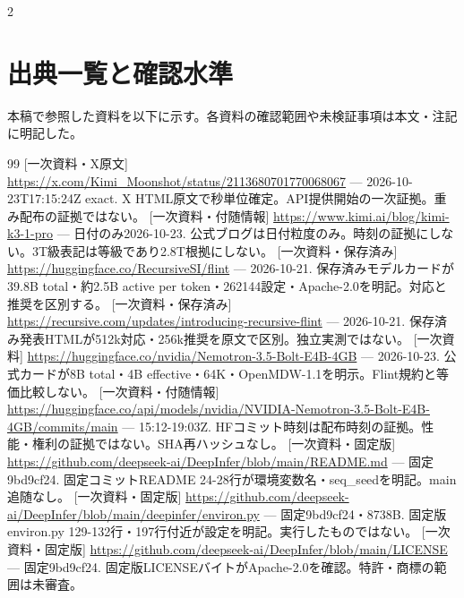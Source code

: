 \documentclass[lualatex,a4paper,10pt]{jlreq}
\begin{document}
\begin{multicols}{2} %
\section*{出典一覧と確認水準}
本稿で参照した資料を以下に示す。各資料の確認範囲や未検証事項は本文・注記に明記した。

{\footnotesize\setlength{\itemsep}{2pt}\setlength{\parsep}{0pt}
\begin{thebibliography}{99}
 [一次資料・X原文] \url{https://x.com/Kimi_Moonshot/status/2113680701770068067} --- 2026-10-23T17:15:24Z exact. X HTML原文で秒単位確定。API提供開始の一次証拠。重み配布の証拠ではない。
 [一次資料・付随情報] \url{https://www.kimi.ai/blog/kimi-k3-1-pro} --- 日付のみ2026-10-23. 公式ブログは日付粒度のみ。時刻の証拠にしない。3T級表記は等級であり2.8T根拠にしない。
 [一次資料・保存済み] \url{https://huggingface.co/RecursiveSI/flint} --- 2026-10-21. 保存済みモデルカードが39.8B total・約2.5B active per token・262144設定・Apache-2.0を明記。対応と推奨を区別する。
 [一次資料・保存済み] \url{https://recursive.com/updates/introducing-recursive-flint} --- 2026-10-21. 保存済み発表HTMLが512k対応・256k推奨を原文で区別。独立実測ではない。
 [一次資料] \url{https://huggingface.co/nvidia/Nemotron-3.5-Bolt-E4B-4GB} --- 2026-10-23. 公式カードが8B total・4B effective・64K・OpenMDW-1.1を明示。Flint規約と等価比較しない。
 [一次資料・付随情報] \url{https://huggingface.co/api/models/nvidia/NVIDIA-Nemotron-3.5-Bolt-E4B-4GB/commits/main} --- 15:12-19:03Z. HFコミット時刻は配布時刻の証拠。性能・権利の証拠ではない。SHA再ハッシュなし。
 [一次資料・固定版] \url{https://github.com/deepseek-ai/DeepInfer/blob/main/README.md} --- 固定9bd9cf24. 固定コミットREADME 24-28行が環境変数名・seq\_seedを明記。main追随なし。
 [一次資料・固定版] \url{https://github.com/deepseek-ai/DeepInfer/blob/main/deepinfer/environ.py} --- 固定9bd9cf24・8738B. 固定版environ.py 129-132行・197行付近が設定を明記。実行したものではない。
 [一次資料・固定版] \url{https://github.com/deepseek-ai/DeepInfer/blob/main/LICENSE} --- 固定9bd9cf24. 固定版LICENSEバイトがApache-2.0を確認。特許・商標の範囲は未審査。

\end{thebibliography}}
\end{multicols}
\end{document}

